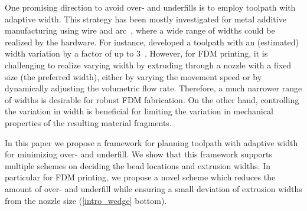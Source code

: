 One promising direction to avoid over- and underfills is to employ toolpath with adaptive width. 
This strategy has been mostly investigated for metal additive manufacturing using wire and arc~\cite{Ding2014,Xiong2019}, where a wide range of widths could be realized by the hardware. 
For instance, \citeauthor{Ding2016a} developed a toolpath with an (estimated) width variation by a factor of up to $3$~\cite{Ding2016a}.
However, for FDM printing, it is challenging to realize varying width by extruding through a nozzle with a fixed size (the preferred width), either by varying the movement speed or by dynamically adjusting the volumetric flow rate. 
Therefore, a much narrower range of widths is desirable for robust FDM fabrication.
On the other hand, controlling the variation in width is beneficial for limiting the variation in mechanical properties of the resulting material fragments. 

In this paper we propose a framework for planning toolpath with adaptive width for minimizing over- and underfill. 
We show that this framework supports multiple schemes on deciding the bead locations and extrusion widths. 
In particular for FDM printing, we propose a novel scheme which reduces the amount of over- and underfill while ensuring a small deviation of extrusion widths from the nozzle size (\cref{intro_wedge} bottom). 

